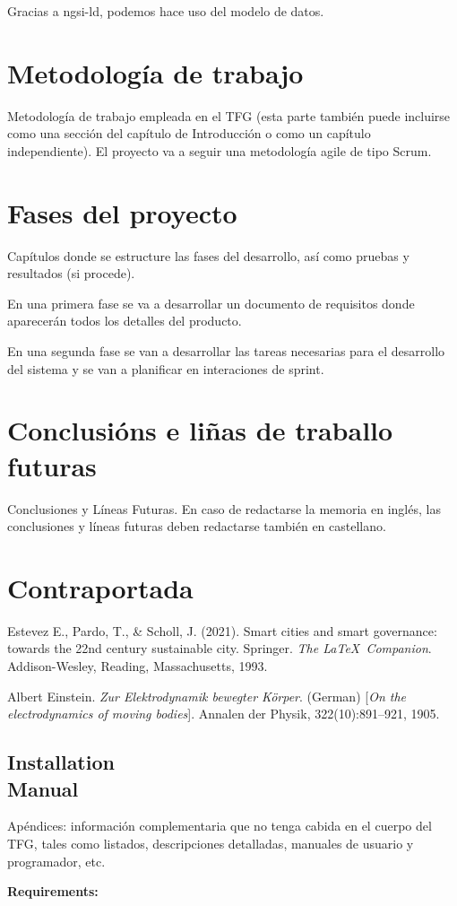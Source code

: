 \documentclass[12pt, a4paper, twoside]{article}
\begin{document}
Gracias a ngsi-ld, podemos hace uso del modelo de datos.

\section{Metodología de trabajo}
Metodología de trabajo empleada en el TFG (esta parte también puede incluirse como una sección del capítulo de Introducción o como un capítulo independiente).
El proyecto va a seguir una metodología agile de tipo Scrum.


\section{Fases del proyecto}
Capítulos donde se estructure las fases del desarrollo, así como pruebas y resultados (si procede). 

En una primera fase se va a desarrollar un documento de requisitos donde aparecerán todos los detalles del producto.

En una segunda fase se van a desarrollar las tareas necesarias para el desarrollo del sistema y se van
a planificar en interaciones de sprint. 

\section{Conclusións e liñas de traballo futuras}
Conclusiones y Líneas Futuras. En caso de redactarse la memoria en inglés, las conclusiones y líneas futuras deben redactarse también en castellano.

\section{Contraportada}
\begin{thebibliography}{9}
Estevez E., Pardo, T., \& Scholl, J. (2021).
Smart cities and smart governance: towards the 22nd century sustainable city. Springer.
  \textit{The \LaTeX\ Companion}. 
  Addison-Wesley, Reading, Massachusetts, 1993.
  
  Albert Einstein. 
  \textit{Zur Elektrodynamik bewegter K{\"o}rper}. (German) 
  [\textit{On the electrodynamics of moving bodies}]. 
  Annalen der Physik, 322(10):891–921, 1905.

\end{thebibliography}

\newpage

\begin{umaappendices}
\section{Installation \\ Manual}
Apéndices: información complementaria que no tenga cabida en el cuerpo del TFG, tales como listados, descripciones detalladas, manuales de usuario y programador, etc. 
  
  \textbf{\large{Requirements:}}
  
  \blindtext

\end{umaappendices}
\end{document}
